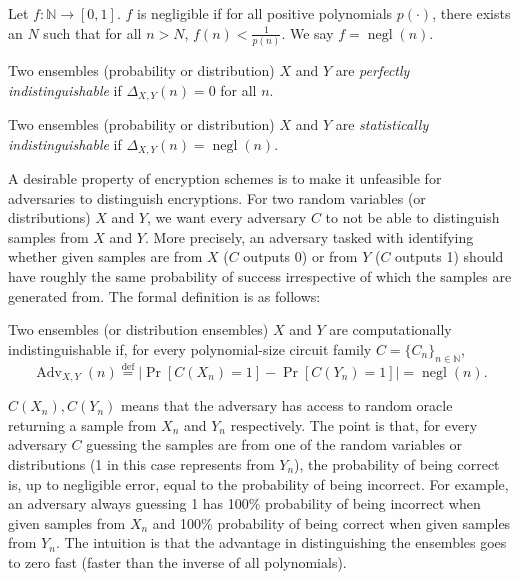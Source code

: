 \begin{definition}
    Let $f \colon \mathbb{N} \to [0,1]$. $f$ is negligible if for all positive polynomials $p(\cdot)$, there exists an $N$ such that for all $n>N$, $f(n) < \frac{1}{p(n)}$. We say $f = \operatorname{negl}(n)$.
\end{definition}
\begin{definition} \label{def:perfectly-indistinguishable}
    Two ensembles (probability or distribution) $X$ and $Y$ are \emph{perfectly indistinguishable} if $\Delta_{X,Y}(n) = 0$ for all $n$.
\end{definition}
\begin{definition} \label{def:statistically-indistinguishable}
    Two ensembles (probability or distribution) $X$ and $Y$ are \emph{statistically indistinguishable} if $\Delta_{X,Y}(n) = \operatorname{negl}(n)$.
\end{definition}
 A desirable property of encryption schemes is to make it unfeasible for adversaries to distinguish encryptions. For two random variables (or distributions) $X$ and $Y$, we want every adversary $C$ to not be able to distinguish samples from $X$ and $Y$. More precisely, an adversary tasked with identifying whether given samples are from $X$ ($C$ outputs 0) or from $Y$ ($C$ outputs 1) should have roughly the same probability of success irrespective of which the samples are generated from. The formal definition is as follows:
\begin{definition} \label{def:computationally-indistinguishable}
    Two ensembles (or distribution ensembles) $X$ and $Y$ are computationally indistinguishable if, for every polynomial-size circuit family $C = \{C_n\}_{n \in \mathbb{N}}$, $$\operatorname{Adv}_{X,Y}(n) \stackrel{\mathrm{def}}{=} |\operatorname{Pr}[C(X_n) = 1] - \operatorname{Pr}[C(Y_n) = 1]| = \operatorname{negl}(n).$$
\end{definition}
$C(X_n), C(Y_n)$ means that the adversary has access to random oracle returning a sample from $X_n$ and $Y_n$ respectively. The point is that, for every adversary $C$ guessing the samples are from one of the random variables or distributions (1 in this case represents from $Y_n$), the probability of being correct is, up to negligible error, equal to the probability of being incorrect. For example, an adversary always guessing 1 has 100\% probability of being incorrect when given samples from $X_n$ and 100\% probability of being correct when given samples from $Y_n$. The intuition is that the advantage in distinguishing the ensembles goes to zero fast (faster than the inverse of all polynomials).

